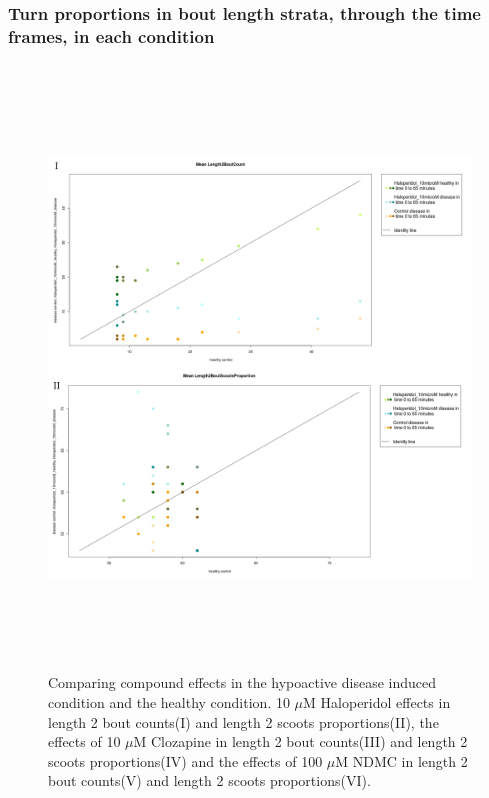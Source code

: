 \subsubsection{Turn proportions in bout length strata, through the time frames, in each condition}
\begin{figure}[h!]
\begin{center}
\caption{Comparing compound effects in the hypoactive disease induced condition and the healthy condition. 10 $\mu$M Haloperidol effects in length 2 bout counts(I) and length 2 scoots proportions(II), the effects of 10 $\mu$M Clozapine in length 2 bout counts(III) and length 2 scoots proportions(IV) and the effects of 100 $\mu$M NDMC in length 2 bout counts(V) and length 2 scoots proportions(VI).}
\includegraphics[width=15cm,height=16cm]{ApoLowCountScootsH.png}
\end{center}
\end{figure}
\newpage
